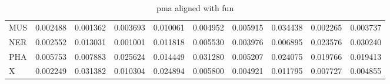 \begin{table}[H]
\begin{center}
{\begin{tabular}{lrrrrrrrrr}
MUS & {\cellcolor[HTML]{FEFFE1}} \color[HTML]{000000} 0.002488 & {\cellcolor[HTML]{FFFFE5}} \color[HTML]{000000} 0.001362 & {\cellcolor[HTML]{FDFEDD}} \color[HTML]{000000} 0.003693 & {\cellcolor[HTML]{FAFDC9}} \color[HTML]{000000} 0.010061 & {\cellcolor[HTML]{FDFED9}} \color[HTML]{000000} 0.004952 & {\cellcolor[HTML]{FCFED6}} \color[HTML]{000000} 0.005915 & {\cellcolor[HTML]{C9E99C}} \color[HTML]{000000} 0.034438 & {\cellcolor[HTML]{FEFFE2}} \color[HTML]{000000} 0.002265 & {\cellcolor[HTML]{FDFEDD}} \color[HTML]{000000} 0.003737 \\
NER & {\cellcolor[HTML]{FEFFE1}} \color[HTML]{000000} 0.002552 & {\cellcolor[HTML]{F8FCC0}} \color[HTML]{000000} 0.013031 & {\cellcolor[HTML]{FFFFE5}} \color[HTML]{000000} 0.001001 & {\cellcolor[HTML]{F9FDC4}} \color[HTML]{000000} 0.011818 & {\cellcolor[HTML]{FCFED7}} \color[HTML]{000000} 0.005530 & {\cellcolor[HTML]{FDFEDD}} \color[HTML]{000000} 0.003976 & {\cellcolor[HTML]{FCFED3}} \color[HTML]{000000} 0.006895 & {\cellcolor[HTML]{E5F5AC}} \color[HTML]{000000} 0.023576 & {\cellcolor[HTML]{D6EFA2}} \color[HTML]{000000} 0.030240 \\
PHA & {\cellcolor[HTML]{FCFED7}} \color[HTML]{000000} 0.005753 & {\cellcolor[HTML]{FBFED0}} \color[HTML]{000000} 0.007883 & {\cellcolor[HTML]{E1F3A9}} \color[HTML]{000000} 0.025624 & {\cellcolor[HTML]{F7FCBC}} \color[HTML]{000000} 0.014449 & {\cellcolor[HTML]{D3EDA0}} \color[HTML]{000000} 0.031280 & {\cellcolor[HTML]{FDFED9}} \color[HTML]{000000} 0.005207 & {\cellcolor[HTML]{E4F4AB}} \color[HTML]{000000} 0.024075 & {\cellcolor[HTML]{EDF8B2}} \color[HTML]{000000} 0.019766 & {\cellcolor[HTML]{EEF9B3}} \color[HTML]{000000} 0.019413 \\
X & {\cellcolor[HTML]{FEFFE2}} \color[HTML]{000000} 0.002249 & {\cellcolor[HTML]{D3EDA0}} \color[HTML]{000000} 0.031382 & {\cellcolor[HTML]{FAFDC8}} \color[HTML]{000000} 0.010304 & {\cellcolor[HTML]{E3F4AA}} \color[HTML]{000000} 0.024894 & {\cellcolor[HTML]{FCFED7}} \color[HTML]{000000} 0.005800 & {\cellcolor[HTML]{FDFEDA}} \color[HTML]{000000} 0.004921 & {\cellcolor[HTML]{F9FDC4}} \color[HTML]{000000} 0.011795 & {\cellcolor[HTML]{FBFED0}} \color[HTML]{000000} 0.007727 & {\cellcolor[HTML]{FDFEDA}} \color[HTML]{000000} 0.004855 \\
\bottomrule
\end{tabular}
}\end{center}
\caption{pma aligned with fun}\end{table}